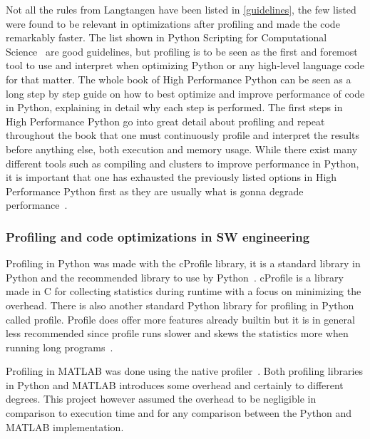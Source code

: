 \documentclass[12pt, a4paper]{article}
\begin{document}
Not all the rules from Langtangen have been listed in \ref{guidelines}, the few listed were found to be relevant in optimizations after profiling and made the code remarkably faster.
The list shown in Python Scripting for Computational Science~\cite{pythonBook} are good guidelines, but profiling is to be seen as the first and foremost tool to use and interpret when optimizing Python or any high-level language code for that matter.
The whole book of High Performance Python can be seen as a long step by step guide on how to best optimize and improve performance of code in Python, explaining in detail why each step is performed. 
The first steps in High Performance Python go into great detail about profiling and repeat throughout the book that one must continuously profile and interpret the results before anything else, both execution and memory usage.
While there exist many different tools such as compiling and clusters to improve performance in Python, it is important that one has exhausted the previously listed options in High Performance Python first as they are usually what is gonna degrade performance~\cite{oreillyCh10}.

\subsubsection{Profiling and code optimizations in SW engineering}
Profiling in Python was made with the cProfile library,
it is a standard library in Python and the recommended library to use by Python~\cite{cProfile}.
cProfile is a library made in C for collecting statistics during runtime with a focus on minimizing the overhead.
There is also another standard Python library for profiling in Python called profile.
Profile does offer more features already builtin but it is in general less recommended since profile runs slower and skews the statistics more when running long programs~\cite{cProfile}.

Profiling in MATLAB was done using the native profiler~\cite{matProfile}.
Both profiling libraries in Python and MATLAB introduces some overhead and certainly to different degrees.
This project however assumed the overhead to be negligible in comparison to execution time and for any comparison between the Python and MATLAB implementation.%
\end{document}

